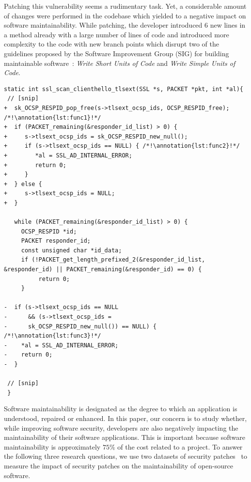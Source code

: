 \documentclass[smallextended]{svjour3}       %
\newcounter{lstannotation}
\renewcommand{\thelstannotation}{\ding{\number\numexpr181+\arabic{lstannotation}}}
\newcommand{\annotation}[1]{\refstepcounter{lstannotation}\label{#1}\thelstannotation}
\begin{document}
Patching this vulnerability seems a rudimentary task. Yet,
a considerable amount of changes were performed in the codebase 
which yielded to a negative impact on software maintainability.
While patching, the developer introduced $6$ new lines in a method 
already with a large number of lines of code and introduced more 
complexity to the code with new branch points which disrupt two of 
the guidelines proposed by the Software Improvement Group 
(SIG) for building maintainable software~\cite{Visser:2016:OREILLY}: 
\emph{Write Short Units of Code} and \emph{Write Simple Units of 
Code}. 

\medskip
\setcounter{lstannotation}{0}
\begin{lstlisting}[style={CStyle}, caption={Patch provided by OpenSSL developers to the
CVE-2016-6304 vulnerability on file ssl/t1\_lib.c},label={lst:vuln}]
static int ssl_scan_clienthello_tlsext(SSL *s, PACKET *pkt, int *al){ 
 // [snip]
+  sk_OCSP_RESPID_pop_free(s->tlsext_ocsp_ids, OCSP_RESPID_free); /*!\annotation{lst:func1}!*/
+  if (PACKET_remaining(&responder_id_list) > 0) { 
+     s->tlsext_ocsp_ids = sk_OCSP_RESPID_new_null();
+     if (s->tlsext_ocsp_ids == NULL) { /*!\annotation{lst:func2}!*/
+        *al = SSL_AD_INTERNAL_ERROR;
+        return 0;
+     }
+  } else {
+     s->tlsext_ocsp_ids = NULL;
+  }

   while (PACKET_remaining(&responder_id_list) > 0) {
     OCSP_RESPID *id;
     PACKET responder_id;
     const unsigned char *id_data;
     if (!PACKET_get_length_prefixed_2(&responder_id_list, &responder_id) || PACKET_remaining(&responder_id) == 0) {
          return 0;
     }

-  if (s->tlsext_ocsp_ids == NULL 
-      && (s->tlsext_ocsp_ids = 
-      sk_OCSP_RESPID_new_null()) == NULL) { /*!\annotation{lst:func3}!*/
-    *al = SSL_AD_INTERNAL_ERROR;
-    return 0;
-  }

 // [snip]
 }
\end{lstlisting}

Software maintainability is designated as the degree to which an 
application is understood, repaired or enhanced. In this paper, our 
concern is to study whether, while improving software security, 
developers are also negatively impacting the maintainability of their
software applications. This is important because software 
maintainability is approximately $75\%$ of the cost related to a 
project. To answer the following three research questions, we use 
two datasets of security 
patches~\cite{Reis:2017:IJSSE,10.1109/MSR.2019.00064} to measure the 
impact of security patches on the maintainability of open-source 
software. 
%
\end{document}
